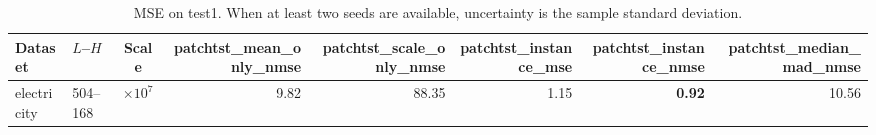 \begin{table}[htbp]
\centering
\caption{MSE on test1. When at least two seeds are available, uncertainty is the sample standard deviation.}
\begin{tabular}{llcrrrrr}
\toprule
Dataset & $L$--$H$ & Scale & patchtst\_mean\_only\_nmse & patchtst\_scale\_only\_nmse & patchtst\_instance\_mse & patchtst\_instance\_nmse & patchtst\_median\_mad\_nmse \\
\midrule
electricity & 504--168 & $\times 10^{7}$ & 9.82 & 88.35 & 1.15 & \textbf{0.92} & 10.56 \\
\bottomrule
\end{tabular}
\end{table}
